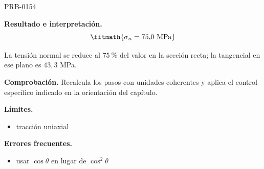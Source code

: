 \begin{studiumworked}{PRB-0154}
\begin{enumerate}
\end{enumerate}

\textbf{Resultado e interpretación.}\[\fitmath{\sigma_n = 75{,}0\ \mathrm{MPa}}\]

La tensión normal se reduce al $75\ \%$ del valor en la sección recta; la tangencial en ese plano es $43{,}3$ MPa.

\par\textbf{Comprobación.} Recalcula los pasos con unidades coherentes y aplica el control específico indicado en la orientación del capítulo.

\textbf{Límites.}\begin{itemize}\item tracción uniaxial\end{itemize}

\textbf{Errores frecuentes.}\begin{itemize}\item usar $\cos\theta$ en lugar de $\cos^2\theta$\end{itemize}

\end{studiumworked}

\Needspace{.3\textheight}


